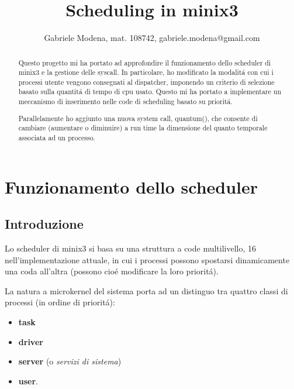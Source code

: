 \documentclass[a4paper,12pt]{report}
\title{Scheduling in minix3}
\author{Gabriele Modena, mat. 108742, gabriele.modena@gmail.com}
\begin{document}
\maketitle
\tableofcontents

\begin{abstract}
Questo progetto mi ha portato ad approfondire il funzionamento dello
scheduler di minix3 e la gestione delle syscall.
In particolare, ho modificato la modalit\'a con cui i processi utente vengono
consegnati al dispatcher, imponendo un criterio di selezione basato 
sulla quantit\'a di tempo di cpu usato.
Questo mi ha portato a implementare un meccanismo di inserimento nelle code
di scheduling basato su priorit\'a.

Parallelamente ho aggiunto una nuova system call, quantum(), che consente di
cambiare (aumentare o diminuire) a run time la dimensione del quanto 
temporale associata ad un processo.

\end{abstract}

\chapter{Funzionamento dello scheduler}
\section{Introduzione}
Lo scheduler di minix3 si basa su una struttura a code multilivello,
16 nell'implementazione attuale, in cui i processi possono spostarsi dinamicamente 
una coda all'altra (possono cio\'e modificare la loro priorit\'a).

La natura a microkernel del sistema porta ad un distinguo tra quattro classi
di processi (in ordine di priorit\'a):
\begin{itemize}
\item  \textbf{task}
\item  \textbf{driver}
\item  \textbf{server} (o \textit{servizi di sistema}) 
\item  \textbf{user}.
\end{itemize}
\end{document}
